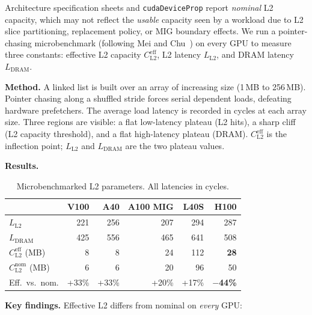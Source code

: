 \documentclass[sigplan,nonacm,10pt]{acmart}
\begin{document}
Architecture specification sheets and \texttt{cudaDeviceProp} report
\emph{nominal} L2 capacity, which may not reflect the \emph{usable}
capacity seen by a workload due to L2 slice partitioning, replacement
policy, or MIG boundary effects.
We run a pointer-chasing microbenchmark (following Mei and
Chu~\cite{mei_dissecting}) on every GPU to measure three constants:
effective L2 capacity $C_{\text{L2}}^{\text{eff}}$, L2 latency
$L_{\text{L2}}$, and DRAM latency $L_{\text{DRAM}}$.

\textbf{Method.}
A linked list is built over an array of increasing size (1\,MB to
256\,MB).
Pointer chasing along a shuffled stride forces serial dependent loads,
defeating hardware prefetchers.
The average load latency is recorded in cycles at each array size.
Three regions are visible: a flat low-latency plateau (L2 hits), a sharp
cliff (L2 capacity threshold), and a flat high-latency plateau (DRAM).
$C_{\text{L2}}^{\text{eff}}$ is the inflection point; $L_{\text{L2}}$
and $L_{\text{DRAM}}$ are the two plateau values.

\textbf{Results.}

\begin{table}[h]
\centering
\small
\caption{Microbenchmarked L2 parameters. All latencies in cycles.}
\label{tab:microbench}
\renewcommand{\arraystretch}{1.2}
\begin{tabular}{@{}lrrrrr@{}}
\toprule
 & \textbf{V100} & \textbf{A40} & \textbf{A100 MIG} & \textbf{L40S}
 & \textbf{H100} \\
\midrule
$L_{\text{L2}}$   & 221 & 256 & 207 & 294 & 287 \\
$L_{\text{DRAM}}$ & 425 & 556 & 465 & 641 & 508 \\
$C_{\text{L2}}^{\text{eff}}$ (MB) & 8 & 8 & 24 & 112 & \textbf{28} \\
$C_{\text{L2}}^{\text{nom}}$ (MB) & 6 & 6 & 20 &  96 & 50 \\
\midrule
Eff.\ vs.\ nom. & +33\% & +33\% & +20\% & +17\% & \textbf{$-$44\%} \\
\bottomrule
\end{tabular}
\end{table}

\textbf{Key findings.}
Effective L2 differs from nominal on \emph{every} GPU:
\end{document}
